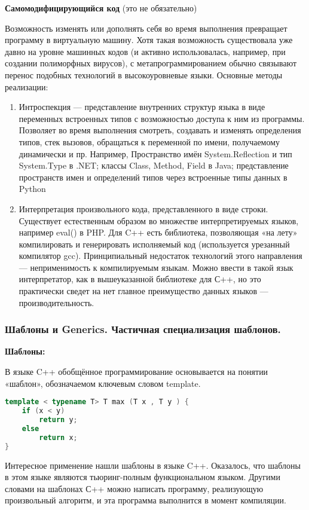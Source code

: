 \documentclass{article}
\begin{document}
\textbf{Самомодифицирующийся код} (это не обязательно)

Возможность изменять или дополнять себя во время выполнения превращает программу в виртуальную машину. Хотя такая возможность существовала уже давно на уровне машинных кодов (и активно использовалась, например, при создании полиморфных вирусов), с метапрограммированием обычно связывают перенос подобных технологий в высокоуровневые языки. Основные методы реализации:
\begin{enumerate}
	\item Интроспекция — представление внутренних структур языка в виде переменных встроенных типов с возможностью доступа к ним из программы. Позволяет во время выполнения смотреть, создавать и изменять определения типов, стек вызовов, обращаться к переменной по имени, получаемому динамически и пр.
	Например, Пространство имён System.Reflection и тип System.Type в .NET; классы Class, Method, Field в Java; представление пространств имен и определений типов через встроенные типы данных в Python
	\item  Интерпретация произвольного кода, представленного в виде строки.
	Существует естественным образом во множестве интерпретируемых языков, например eval() в PHP.
	Для C++ есть библиотека, позволяющая «на лету» компилировать и генерировать исполняемый код (используется урезанный компилятор gcc).
	Принципиальный недостаток технологий этого направления — неприменимость к компилируемым языкам. Можно ввести в такой язык интерпретатор, как в вышеуказанной библиотеке для С++, но это
	практически сведет на нет главное преимущество данных языков — производительность.
\end{enumerate}

\subsubsection{Шаблоны и Generics. Частичная специализация шаблонов.}

\textbf{Шаблоны:}

В языке C++ обобщённое программирование основывается на понятии «шаблон», обозначаемом ключевым словом template.

\begin{lstlisting}[language=C++]
template < typename T> T max (T x , T y ) {
	if (x < y)
		return y;
	else
		return x;
}
\end{lstlisting}

Интересное применение нашли шаблоны в языке C++. Оказалось, что шаблоны в этом языке являются тьюринг-полным функциональном языком. Другими словами на шаблонах С++ можно написать программу, реализующую произвольный алгоритм, и эта программа выполнится в момент компиляции.
\end{document}
